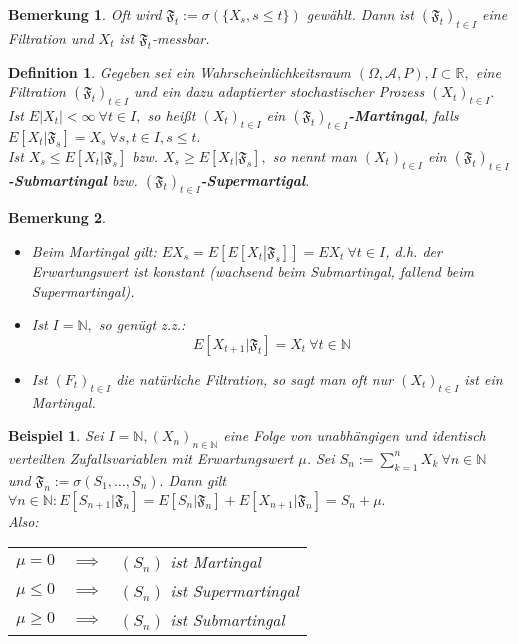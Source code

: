 \documentclass[a4paper,11pt]{scrbook}
\newcommand{\R}{{\mathbb R}}
\newcommand{\N}{{\mathbb N}}
\def\AA{ \mathcal{A} }
\def\FF{ \mathfrak{F} }
\def\folgt{\ensuremath{\implies}}
\newtheorem*{DefON}{Definition}
\newtheorem{Bsp}{Beispiel}[chapter]
\newtheorem*{BemON}{Bemerkung}
\theoremstyle{nonumberplain}
\begin{document}
\begin{BemON} Oft wird $\FF_t := \sigma(\{X_s, s\le t\})$ gewählt. Dann ist $(\FF_t)_{t\in I}$ eine Filtration und $X_t$ ist $\FF_t$-messbar.
\end{BemON}

\begin{DefON}
Gegeben sei ein Wahrscheinlichkeitsraum $(\Omega, \AA, P), I\subset\R,$ eine Filtration $(\FF_t)_{t\in I}$ und ein dazu adaptierter stochastischer Prozess $(X_t)_{t\in I}.$ Ist $E|X_t|<\infty\ \forall t\in I,$ so heißt $(X_t)_{t\in I}$ ein \textbf{$(\FF_t)_{t\in I}$-Martingal}, falls $E[X_t|\FF_s] = X_s\ \forall s, t\in I, s\le t.$\\
Ist $X_s\le E[X_t|\FF_s]$ bzw. $X_s\ge E[X_t|\FF_s],$ so nennt man $(X_t)_{t\in I}$ ein \textbf{$(\FF_t)_{t\in I}$-Submartingal} bzw. \textbf{$(\FF_t)_{t\in I}$-Supermartigal}.
\end{DefON}

\begin{BemON}
\begin{itemize}
\item[a)] Beim Martingal gilt: $EX_s = E\left[E\left[X_t\left|\FF_s\right.\right]\right] = EX_t\ \forall t\in I$, d.h. der Erwartungswert ist konstant (wachsend beim Submartingal, fallend beim Supermartingal).
\item[b)] Ist $I = \N,$ so genügt z.z.:
$$E[X_{t+1}|\FF_t] = X_t\ \forall t\in\N$$
\item[c)] Ist $(F_t)_{t\in I}$ die natürliche Filtration, so sagt man oft nur $(X_t)_{t\in I}$ ist ein Martingal.
\end{itemize}
\end{BemON}

\begin{Bsp} \label{Bsp8.1}
Sei $I=\N, (X_n)_{n\in\N}$ eine Folge von unabhängigen und identisch verteilten Zufallsvariablen mit Erwartungswert $\mu$. Sei $S_n:=\sum_{k=1}^n X_k\ \forall n\in\N$ und $\FF_n:=\sigma(S_1,\ldots, S_n).$ Dann gilt $\forall n\in\N: E[S_{n+1}|\FF_n] = E[S_n|\FF_n] + E[X_{n+1}|\FF_n] = S_n + \mu.$\\
Also: \begin{tabular}[t]{rcp{}}
$\mu = 0$ & $\folgt$ & $(S_n)$ ist Martingal\\
$\mu \le 0$ & $\folgt$ & $(S_n)$ ist Supermartingal\\
$\mu \ge 0$ & $\folgt$ & $(S_n)$ ist Submartingal\\
\end{tabular}
\end{Bsp}
\end{document}
